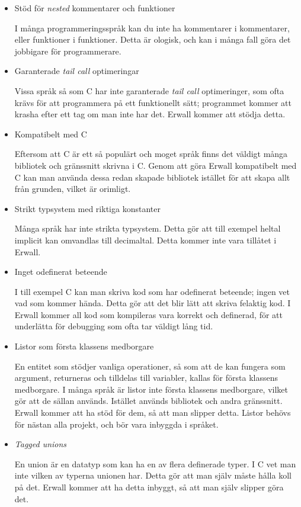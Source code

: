\documentclass{theme}
\begin{document}
\begin{itemize}
	\item Stöd för \textit{nested} kommentarer och funktioner

		I många programmeringsspråk kan du inte ha kommentarer i kommentarer,
		eller funktioner i funktioner. Detta är ologisk, och kan i många fall
		göra det jobbigare för programmerare.

	\item Garanterade \textit{tail call} optimeringar

		Vissa språk så som C har inte garanterade \textit{tail call}
		optimeringer, som
		ofta krävs för att programmera på ett funktionellt sätt; programmet
		kommer att krasha efter ett tag om man inte har det. Erwall kommer
		att stödja detta.

	\item Kompatibelt med C

		Eftersom att C är ett så populärt och moget språk finns det väldigt
		många bibliotek och gränssnitt skrivna i C. Genom att göra Erwall
		kompatibelt med C kan man använda dessa redan skapade bibliotek istället
		för att skapa allt från grunden, vilket är orimligt.

	\item Strikt typsystem med riktiga konstanter

		Många språk har inte strikta typsystem. Detta gör att till exempel
		heltal implicit kan omvandlas till decimaltal. Detta kommer inte vara
		tillåtet i Erwall.

	\item Inget odefinerat beteende

		I till exempel C kan man skriva kod som har odefinerat beteende; ingen
		vet vad som kommer hända. Detta gör att det blir lätt att skriva
		felaktig kod. I Erwall kommer all kod som kompileras vara korrekt och
		definerad, för att underlätta för debugging som ofta tar väldigt lång
		tid.

	\item Listor som första klassens medborgare

		En entitet som stödjer vanliga operationer, så som att de kan fungera
		som argument, returneras och tilldelas till variabler, kallas för första
		klassens medborgare. I många språk är listor inte första klassens
		medborgare, vilket gör att de sällan används. Istället används bibliotek
		och andra gränssnitt. Erwall kommer att ha stöd för dem, så att man
		slipper detta. Listor behövs för nästan alla projekt, och bör vara
		inbyggda i språket.

	\item \textit{Tagged unions}

		En union är en datatyp som kan ha en av flera definerade typer. I C
		vet man inte vilken av typerna unionen har. Detta gör att man själv
		måste hålla koll på det. Erwall kommer att ha detta inbyggt, så att
		man själv slipper göra det.

\end{itemize}
\end{document}
